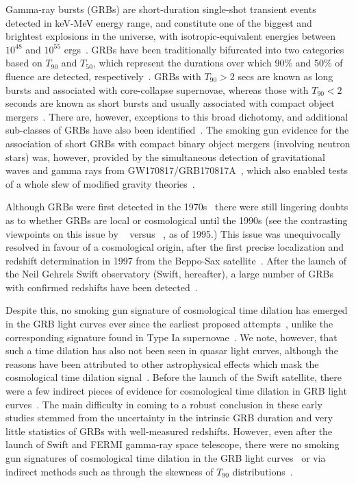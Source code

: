 \documentclass[prd,nofootinbib,preprintnumbers,floatfix]{revtex4}  %
\begin{document}
Gamma-ray bursts (GRBs) are  short-duration single-shot transient events detected in keV-MeV energy range,  and constitute one of the biggest and brightest explosions in the universe, with isotropic-equivalent energies  between $10^{48}$ and $10^{55}$ ergs~\cite{Kumar}. GRBs have been traditionally bifurcated into two categories based on $T_{90}$ and $T_{50}$, which represent the durations over which 90\% and 50\% of fluence are detected, respectively~\cite{Kouveliotou93}. GRBs with $T_{90}> 2$ secs are known as long bursts and associated with core-collapse supernovae, whereas those with $T_{90}<2$ seconds are known as short bursts and usually associated with compact object mergers~\cite{Levan,Piran,Nakar,Berger}. There are, however, exceptions to this broad dichotomy, and additional sub-classes of GRBs have also been identified~\cite{Horvath98,Horvath02,Horvath06,Horvath08,Zhang09,Horvath10,Bromberg,Kulkarni,Tarno19,Horvath18}. The smoking gun evidence for the association of short GRBs with compact binary object mergers (involving neutron stars) was, however, provided by the simultaneous detection of gravitational waves and gamma rays from GW170817/GRB170817A~\cite{LIGO}, which also enabled tests of a whole slew of modified gravity theories~\cite{Woodard}.

Although GRBs were first detected in the 1970s~\cite{firstgrb} there were still lingering doubts as to whether GRBs are local or cosmological until the 1990s (see the contrasting viewpoints on this issue by
~\cite{Paczynski} versus ~\cite{Lamb}, as of 1995.) This issue was unequivocally resolved in favour of a cosmological origin,  after the first precise localization and redshift determination in 1997 from the Beppo-Sax satellite~\cite{vanPara}. After the launch of the Neil Gehrels Swift observatory (Swift, hereafter), a large number of GRBs with confirmed redshifts have been detected~\cite{SWIFT}.


Despite this, no smoking gun signature of cosmological time dilation has emerged in the GRB light curves ever since the earliest proposed attempts~\cite{Piran92,Paczynski92}, unlike the corresponding signature found in Type
Ia supernovae~\cite{Goldhaber}. We note, however, that such a time dilation has also not been seen in quasar light curves, although the reasons have been attributed to other astrophysical effects which mask the cosmological time dilation signal~\cite{Hawkins}. 
Before the launch of the Swift satellite, there were a few indirect pieces of evidence for cosmological time dilation in GRB light curves~\cite{Norris,Che97,Deng98,Lee2000,Chang01}.  The main difficulty in coming to a robust conclusion in these early studies stemmed from the  uncertainty in the intrinsic GRB duration and very little statistics of GRBs with well-measured redshifts. However, even after the launch of Swift and FERMI gamma-ray space telescope, there were  no smoking gun signatures of cosmological time dilation in the GRB light curves~\cite{Sakamoto,Petrosian13,Gruber,Lien,Crawford} or via indirect methods such as through the skewness of $T_{90}$ distributions~\cite{Tarno}.
\end{document}
